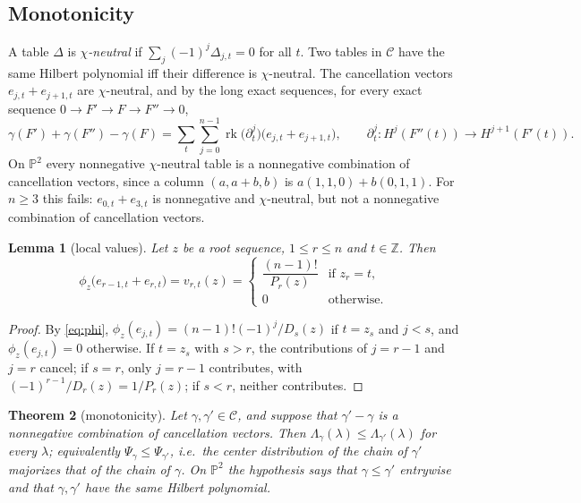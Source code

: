 \documentclass[11pt]{amsart}
\newtheorem{theorem}{Theorem}[section]
\newtheorem{lemma}[theorem]{Lemma}
\theoremstyle{definition}
\theoremstyle{remark}
\newcommand{\PP}{\mathbb{P}}
\newcommand{\ZZ}{\mathbb{Z}}
\newcommand{\CC}{\mathcal{C}}
\DeclareMathOperator{\rk}{rk}
\begin{document}
\subsection{Monotonicity}
A table $\Delta$ is \emph{$\chi$-neutral} if $\sum_j(-1)^j\Delta_{j,t}=0$ for all $t$. Two tables in $\CC$ have the same Hilbert polynomial iff their difference is $\chi$-neutral. The cancellation vectors $e_{j,t}+e_{j+1,t}$ are $\chi$-neutral, and by the long exact sequences, for every exact sequence $0\to F'\to F\to F''\to0$,
\begin{equation}\label{eq:extdiff}
\gamma(F')+\gamma(F'')-\gamma(F)=\sum_t\sum_{j=0}^{n-1}\rk\big(\partial^j_t\big)\big(e_{j,t}+e_{j+1,t}\big),\qquad \partial^j_t\colon H^j(F''(t))\to H^{j+1}(F'(t)).
\end{equation}
On $\PP^2$ every nonnegative $\chi$-neutral table is a nonnegative combination of cancellation vectors, since a column $(a,a+b,b)$ is $a(1,1,0)+b(0,1,1)$. For $n\ge3$ this fails: $e_{0,t}+e_{3,t}$ is nonnegative and $\chi$-neutral, but not a nonnegative combination of cancellation vectors.

\begin{lemma}[local values]\label{lem:localvalues}
Let $z$ be a root sequence, $1\le r\le n$ and $t\in\ZZ$. Then
\[
\phi_z\big(e_{r-1,t}+e_{r,t}\big)=v_{r,t}(z)=\begin{cases}\dfrac{(n-1)!}{P_r(z)} & \text{if } z_r=t,\\[2ex] 0 & \text{otherwise.}\end{cases}
\]
\end{lemma}

\begin{proof}
By \eqref{eq:phi}, $\phi_z(e_{j,t})=(n-1)!(-1)^j/D_s(z)$ if $t=z_s$ and $j<s$, and $\phi_z(e_{j,t})=0$ otherwise. If $t=z_s$ with $s>r$, the contributions of $j=r-1$ and $j=r$ cancel; if $s=r$, only $j=r-1$ contributes, with $(-1)^{r-1}/D_r(z)=1/P_r(z)$; if $s<r$, neither contributes.
\end{proof}

\begin{theorem}[monotonicity]\label{thm:monotone}
Let $\gamma,\gamma'\in\CC$, and suppose that $\gamma'-\gamma$ is a nonnegative combination of cancellation vectors. Then $\Lambda_\gamma(\lambda)\le\Lambda_{\gamma'}(\lambda)$ for every $\lambda$; equivalently $\Psi_\gamma\le\Psi_{\gamma'}$, i.e.\ the center distribution of the chain of $\gamma'$ majorizes that of the chain of $\gamma$. On $\PP^2$ the hypothesis says that $\gamma\le\gamma'$ entrywise and that $\gamma,\gamma'$ have the same Hilbert polynomial.
\end{theorem}
\end{document}
